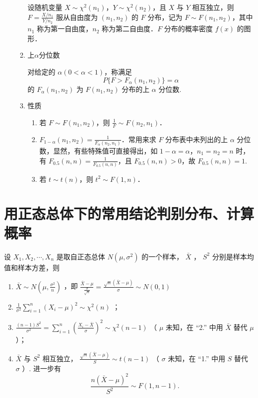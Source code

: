 \begin{enumerate}
\begin{enumerate}
                        设随机变量 $X \sim \chi^2(n_1)$，$Y \sim \chi^2(n_2)$，且 $X$ 与 $Y$ 相互独立，则 $F = \frac{X / n_1}{Y / n_2}$ 服从自由度为 $(n_1, n_2)$ 的 $F$ 分布，记为 $F \sim F(n_1, n_2)$，其中 $n_1$ 称为第一自由度，$n_2$ 称为第二自由度．$F$ 分布的概率密度 $f(x)$ 的图形．
                  \item 上$\alpha$分位数

                        对给定的 $\alpha (0 < \alpha < 1)$，称满足
                        $$P\{F > F_\alpha(n_1, n_2)\} = \alpha$$
                        的 $F_\alpha(n_1, n_2)$ 为 $F(n_1, n_2)$ 分布的上 $\alpha$ 分位数.
                  \item 性质
                        \begin{enumerate}
                              \item 若 $F \sim F(n_1, n_2)$，则 $\frac{1}{F} \sim F(n_2, n_1)$．
                              \item $F_{1-\alpha}(n_1, n_2) = \frac{1}{F_\alpha(n_2, n_1)}$．常用来求 $F$ 分布表中未列出的上 $\alpha$ 分位数，显然，有些特殊值可直接得出，如 $1-\alpha = \alpha$，$n_1 = n_2 = n$ 时，有 $F_{0.5}(n, n) = \frac{1}{F_{0.5}(n, n)}$，且 $F_{0.5}(n, n) > 0$，故 $F_{0.5}(n, n) = 1$.
                              \item 若 $t \sim t(n)$，则 $t^2 \sim F(1, n)$．
                        \end{enumerate}
            \end{enumerate}
\end{enumerate}
\section{用正态总体下的常用结论判别分布、计算概率}
设 $X_{1}, X_{2}, \cdots, X_{n}$ 是取自正态总体 $N(\mu, \sigma^{2})$ 的一个样本， $\bar{X}$ ， $S^{2}$ 分别是样本均值和样本方差，则

\begin{enumerate}
      \item $\bar{X} \sim N\left(\mu, \frac{\sigma^{2}}{n}\right)$ ，即 $\frac{\bar{X}-\mu}{\frac{\sigma}{\sqrt{n}}} = \frac{\sqrt{n}(\bar{X}-\mu)}{\sigma} \sim N(0,1)$
      \item $\frac{1}{\sigma^{2}} \sum_{i=1}^{n}(X_{i}-\mu)^{2} \sim \chi^{2}(n)$ ；
      \item $\frac{(n-1)S^{2}}{\sigma^{2}} = \sum_{i=1}^{n}\left(\frac{X_{i}-\bar{X}}{\sigma}\right)^{2} \sim \chi^{2}(n-1)$ （ $\mu$ 未知，在 “2.” 中用 $\bar{X}$ 替代 $\mu$ ）；
      \item $\bar{X}$ 与 $S^{2}$ 相互独立， $\frac{\sqrt{n}(\bar{X}-\mu)}{S} \sim t(n-1)$ （ $\sigma$ 未知，在 “1.” 中用 $S$ 替代 $\sigma$ ）. 进一步有
            $$\frac{n(\bar{X}-\mu)^{2}}{S^{2}} \sim F(1, n-1).$$
\end{enumerate}

